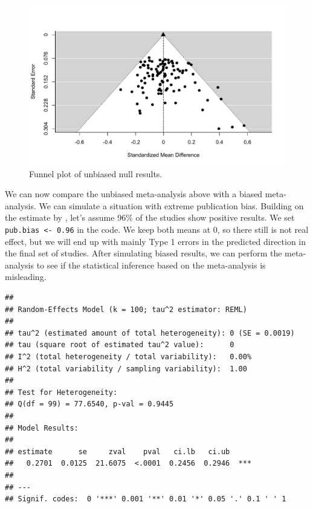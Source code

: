 \documentclass[
  oneside]{book}
\begin{document}
\begin{figure}

{\centering \includegraphics[width=1\linewidth]{12-bias_files/figure-latex/funnel1-1} 

}

\caption{Funnel plot of unbiased null results.}\label{fig:funnel1}
\end{figure}

We can now compare the unbiased meta-analysis above with a biased meta-analysis. We can simulate a situation with extreme publication bias. Building on the estimate by \citet{scheel_excess_2021}, let's assume 96\% of the studies show positive results. We set \texttt{pub.bias\ \textless{}-\ 0.96} in the code. We keep both means at 0, so there still is not real effect, but we will end up with mainly Type 1 errors in the predicted direction in the final set of studies. After simulating biased results, we can perform the meta-analysis to see if the statistical inference based on the meta-analysis is misleading.

\begin{verbatim}
## 
## Random-Effects Model (k = 100; tau^2 estimator: REML)
## 
## tau^2 (estimated amount of total heterogeneity): 0 (SE = 0.0019)
## tau (square root of estimated tau^2 value):      0
## I^2 (total heterogeneity / total variability):   0.00%
## H^2 (total variability / sampling variability):  1.00
## 
## Test for Heterogeneity:
## Q(df = 99) = 77.6540, p-val = 0.9445
## 
## Model Results:
## 
## estimate      se     zval    pval   ci.lb   ci.ub 
##   0.2701  0.0125  21.6075  <.0001  0.2456  0.2946  *** 
## 
## ---
## Signif. codes:  0 '***' 0.001 '**' 0.01 '*' 0.05 '.' 0.1 ' ' 1
\end{verbatim}
\end{document}

